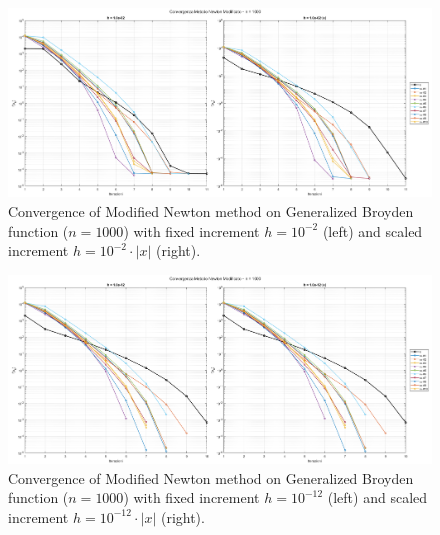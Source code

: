 \documentclass[a4paper,12pt]{article}
\begin{document}
	\newpage
	\begin{figure}[H]
		\centering
		\includegraphics[width=\textwidth]{../immagini/broyden_1k_h2.png}
		\caption{Convergence of Modified Newton method on Generalized Broyden function ($n=1000$) with fixed increment $h = 10^{-2}$ (left) and scaled increment $h = 10^{-2}\cdot|x|$ (right).}
		\label{fig:fd_broyden_1k_h2}
	\end{figure}
	
	\begin{figure}[htbp]
		\centering
		\includegraphics[width=\textwidth]{../immagini/broyden_1k_h12.png}
		\caption{Convergence of Modified Newton method on Generalized Broyden function ($n=1000$) with fixed increment $h = 10^{-12}$ (left) and scaled increment $h = 10^{-12}\cdot|x|$ (right).}
		\label{fig:fd_broyden_1k_h12}
	\end{figure}
	\newpage
	
\end{document}
